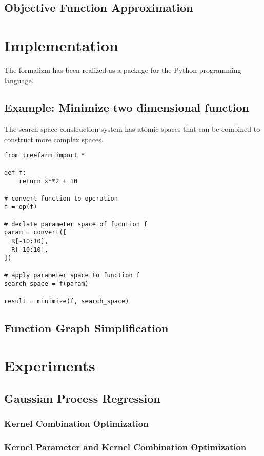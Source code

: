 \documentclass[english]{article}
\begin{document}
\subsection{Objective Function Approximation}


\section{Implementation}
The formalizm has been realized as a package for the Python programming language.

\subsection{Example: Minimize two dimensional function}
The search space construction system has atomic spaces that can
be combined to construct more complex spaces.

\begin{verbatim}
from treefarm import *

def f:
    return x**2 + 10

# convert function to operation
f = op(f)

# declate parameter space of fucntion f
param = convert([
  R[-10:10],
  R[-10:10],
])

# apply parameter space to function f
search_space = f(param)

result = minimize(f, search_space)

\end{verbatim}

\subsection{Function Graph Simplification}

\section{Experiments}


\subsection{Gaussian Process Regression}
\subsubsection{Kernel Combination Optimization}
\subsubsection{Kernel Parameter and Kernel Combination Optimization}
\end{document}

